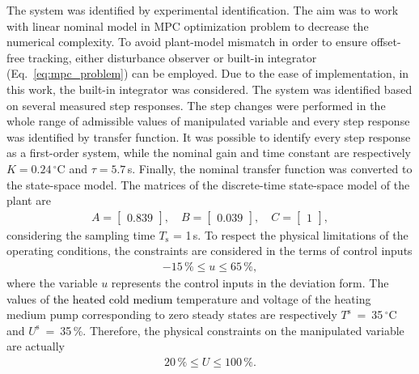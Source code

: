\documentclass[preprint,12pt]{elsarticle}
\newcommand{\change}[1]{\textcolor{black}{#1}}
\begin{document}
The system was identified by experimental identification. The aim was to work with linear nominal model in MPC optimization problem to decrease the numerical complexity. To avoid plant-model mismatch in order to ensure offset-free tracking, either disturbance observer or built-in integrator (Eq.~\eqref{eq:mpc_problem}) can be employed. Due to the ease of implementation, in this work, the built-in integrator was considered. The system was identified based on several measured step responses. The step changes were performed in the whole range of admissible values of manipulated variable and every step response was identified by transfer function. It was possible to identify every step response as a first-order system, while the nominal gain and time constant are respectively $K = 0.24\,^{\circ}\mathrm{C}$ and $\tau = 5.7$\,s. 
Finally, the nominal transfer function was converted to the state-space model. The matrices of the discrete-time state-space model of the plant are
\begin{subequations}
	\label{eq:model_A_B} 
	\begin{eqnarray}
		A = \begin{bmatrix}
			0.839
		\end{bmatrix}, \quad
		B = \begin{bmatrix}
			0.039
		\end{bmatrix}, \quad
		C = \begin{bmatrix}
			1
		\end{bmatrix}, 
	\end{eqnarray}
\end{subequations}
considering the sampling time $T_\mathrm{s}$ = 1\,s. 
To respect the physical limitations of the operating conditions, the constraints are considered in the terms of control inputs
\begin{eqnarray}
	\label{eq:u_const}
	-15\,\% \le u \le 65\,\%,
\end{eqnarray}
where the variable $u$ represents the control inputs in the deviation form. The values of \change{the heated cold medium} temperature and voltage of the heating medium pump corresponding to zero steady states are respectively $T^\mathrm{s}$~=~35\,$^{\circ}\mathrm{C}$ and $U^\mathrm{s}$~=~35\,\%. Therefore, the physical constraints on the manipulated variable are actually
\begin{eqnarray}
	\label{eq:U_const}
	20\,\% \le U \le 100\,\%.
\end{eqnarray}	
\end{document}
